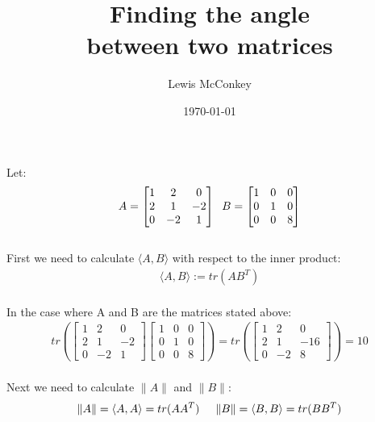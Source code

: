 \documentclass[reqno,a4paper,12pt]{amsart}
\author{Lewis McConkey}
\date{\today}
\title{ \LARGE{Finding the angle} \\
   \hspace{16cm}between two matrices}
\begin{document}
\maketitle
Let:
 \begin{align}
    A 
    =
    \begin{bmatrix}
        1  &  2 &  0  \\
        2  &  1  &   -2  \\
        0  &  -2  &  1
    \end{bmatrix}\hspace{0.2cm}
    B
    =
    \begin{bmatrix}
        1 &  0 &  0  \\
        0  &  1  &   0  \\
        0  &  0  &  8
    \end{bmatrix} \label{eq:1}
  \end{align}\\
First we need to calculate $\langle A,B \rangle$ with respect to the inner product:
    \begin{align}
      \langle A,B \rangle
      := 
      tr(AB^T) \label{eq:2}
     \end{align}\\
In the case where A and B are the matrices stated above:
     \begin{align}
      tr(
      \begin{bmatrix}
        1  &  2 &  0  \\
        2  &  1  &   -2  \\
        0  &  -2  &  1
    \end{bmatrix} 
    \begin{bmatrix}
        1 &  0 &  0  \\
        0  &  1  &   0  \\
        0  &  0  &  8
    \end{bmatrix} 
      ) 
      =
      tr(
      \begin{bmatrix}
        1 & 2 & 0 \\
        2 & 1 & -16 \\
        0 & -2 & 8
      \end{bmatrix}
      )
      =
      10 \label{eq:3}
    \end{align}\\
 Next we need to calculate $\|A\|$ and $\|B\|$:
    \begin{align}
      \|A\|
      =
      \langle A,A \rangle
      =
      tr(AA^T)\hspace{0.5cm}
      \|B\|
      =
      \langle B,B \rangle
      =
      tr(BB^T) \label{eq:4}
    \end{align}\\
\end{document}
